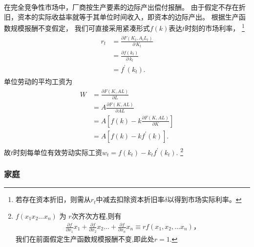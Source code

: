 \documentclass[cn,normal,11pt,black]{elegantnote}
\begin{document}
在完全竞争性市场中，厂商按生产要素的边际产出偿付报酬。
由于假定不存在折旧，资本的实际收益率就等于其单位时间收入，即资本的边际产出。
根据生产函数规模报酬不变假定，
我们可直接采用紧凑形式$f(k)$表达$t$时刻的市场利率，
\footnote{若存在资本折旧，则需从$r_t$中减去扣除资本折旧率$\delta$以得到市场实际利率。}
\begin{align}\label{ramseyr}
    \begin{aligned}
        r_t & = \frac{\partial F(K_t,A_t L_t)}{\partial \, K_t} \\
            & = \frac{\partial f(k_t)}{\partial \, k_t} \\
            & = f^\prime(k_t) .     
    \end{aligned}
\end{align}
单位劳动的平均工资为
\begin{align}
    \begin{aligned}
        W & = \frac{\partial F(K,AL)} {\partial L} \\
        & = A \frac{\partial F(K,AL)} {\partial AL} \\
        & = A \left[f(k) - k \frac{\partial F(K,AL)} {\partial K} \right] \\
        & = A \left[f(k) - k f^\prime(k) \right] .
    \end{aligned}
\end{align}
故$t$时刻每单位有效劳动实际工资$w_t = f(k_t) - k_t f^\prime(k_t)$.
\footnote{$f\left(x_{1} x_{2} \ldots x_{n}\right)$ 为 $r$次齐次方程,则有
        \begin{align*}
            \frac{\partial f}{\partial x_{1}} x_{1} + 
            \frac{\partial f}{\partial x_{2}} x_{2} \ldots + 
            \frac{\partial f}{\partial x_{n}} x_{n} 
                \equiv r f\left(x_{1}, x_{2}, \ldots x_{n}\right)，
        \end{align*}
            我们在前面假定生产函数规模报酬不变,即此处$r=1$.
            }

\subsubsection*{家庭}
\end{document}
